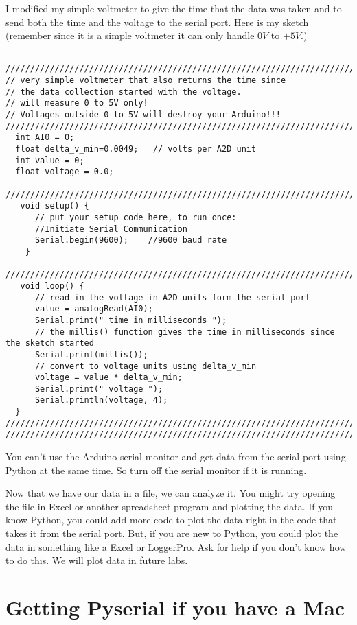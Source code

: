 I modified my simple voltmeter to give the time that the data was taken and
to send both the time and the voltage to the serial port. Here is my sketch
(remember since it is a simple voltmeter it can only handle $0\unit{V}$ to $%
+5\unit{V}.$)
\begin{verbatim}
 
////////////////////////////////////////////////////////////////////////////
// very simple voltmeter that also returns the time since 
// the data collection started with the voltage.
// will measure 0 to 5V only!
// Voltages outside 0 to 5V will destroy your Arduino!!!
////////////////////////////////////////////////////////////////////////////
  int AI0 = 0;
  float delta_v_min=0.0049;   // volts per A2D unit
  int value = 0;
  float voltage = 0.0;
 
////////////////////////////////////////////////////////////////////////////
   void setup() {
      // put your setup code here, to run once:
      //Initiate Serial Communication
      Serial.begin(9600);    //9600 baud rate
    }
    
////////////////////////////////////////////////////////////////////////////
   void loop() {
      // read in the voltage in A2D units form the serial port
      value = analogRead(AI0); 
      Serial.print(" time in milliseconds ");
      // the millis() function gives the time in milliseconds since the sketch started
      Serial.print(millis()); 
      // convert to voltage units using delta_v_min
      voltage = value * delta_v_min;
      Serial.print(" voltage ");
      Serial.println(voltage, 4);  
  }
////////////////////////////////////////////////////////////////////////////
////////////////////////////////////////////////////////////////////////////
\end{verbatim}

You can't use the Arduino serial monitor and get data from the serial port
using Python at the same time. So turn off the serial monitor if it is
running.

Now that we have our data in a file, we can analyze it. You might try
opening the file in Excel or another spreadsheet program and plotting the
data. If you know Python, you could add more code to plot the data right in
the code that takes it from the serial port. But, if you are new to Python,
you could plot the data in something like a Excel or LoggerPro. Ask for help
if you don't know how to do this. We will plot data in future labs.

\section{Getting Pyserial if you have a Mac}

